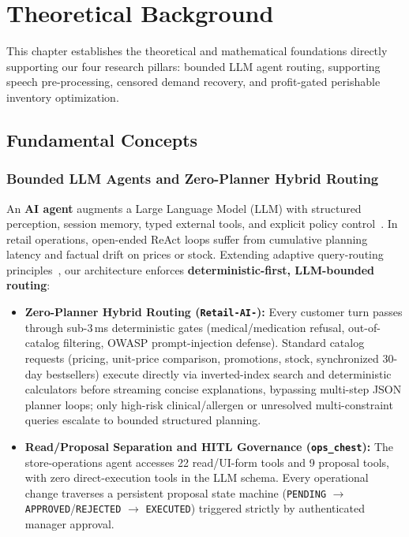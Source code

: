 \chapter{Theoretical Background}

This chapter establishes the theoretical and mathematical foundations directly supporting our four research pillars: bounded LLM agent routing, supporting speech pre-processing, censored demand recovery, and profit-gated perishable inventory optimization.

\section{Fundamental Concepts}

\subsection*{Bounded LLM Agents and Zero-Planner Hybrid Routing}
An \textbf{AI agent} augments a Large Language Model (LLM) with structured perception, session memory, typed external tools, and explicit policy control~\cite{yao2023react,schick2023toolformer}. In retail operations, open-ended ReAct loops suffer from cumulative planning latency and factual drift on prices or stock. Extending adaptive query-routing principles~\cite{chen2023frugalgpt,ong2024routellm}, our architecture enforces \textbf{deterministic-first, LLM-bounded routing}:
\begin{itemize}
    \item \textbf{Zero-Planner Hybrid Routing (\texttt{Retail-AI-}):} Every customer turn passes through sub-3\,ms deterministic gates (medical/medication refusal, out-of-catalog filtering, OWASP prompt-injection defense). Standard catalog requests (pricing, unit-price comparison, promotions, stock, synchronized 30-day bestsellers) execute directly via inverted-index search and deterministic calculators before streaming concise explanations, bypassing multi-step JSON planner loops; only high-risk clinical/allergen or unresolved multi-constraint queries escalate to bounded structured planning.
    \item \textbf{Read/Proposal Separation and HITL Governance (\texttt{ops\_chest}):} The store-operations agent accesses 22 read/UI-form tools and 9 proposal tools, with zero direct-execution tools in the LLM schema. Every operational change traverses a persistent proposal state machine (\texttt{PENDING} $\to$ \texttt{APPROVED}/\texttt{REJECTED} $\to$ \texttt{EXECUTED}) triggered strictly by authenticated manager approval.
\end{itemize}

